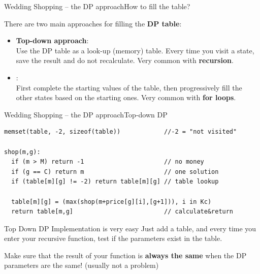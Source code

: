 \begin{frame}{Wedding Shopping -- the DP approach}{How to fill the table?}

  There are two main approaches for filling the {\bf DP table}:
  \bigskip

  \begin{itemize}
  \item {\bf Top-down approach}: \\Use the DP table as a look-up (memory) table. Every time you visit a state, save the result and do not recalculate. Very common with {\bf recursion}.
  \vfill

  \item {}: \\ First complete the starting values of the table, then progressively fill the other states based on the starting ones. Very common with {\bf for loops}.
  \end{itemize}
\end{frame}



\begin{frame}[fragile]{Wedding Shopping -- the DP approach}{Top-down DP}

\begin{block}{}
{\smaller
\begin{verbatim}
memset(table, -2, sizeof(table))            //-2 = "not visited"

shop(m,g):
  if (m > M) return -1                      // no money
  if (g == C) return m                      // one solution
  if (table[m][g] != -2) return table[m][g] // table lookup

  table[m][g] = (max(shop(m+price[g][i],[g+1])), i in Kc)
  return table[m,g]                         // calculate&return
\end{verbatim}}
\end{block}
\vfill

\begin{block}{Top Down DP Implementation is very easy}
  Just add a table, and every time you enter your recursive function, test if the parameters exist in the table.
\end{block}

\begin{alertblock}{}
  Make sure that the result of your function is {\bf always the same} when the DP parameters are the same! (usually not a problem)
\end{alertblock}
\end{frame}

